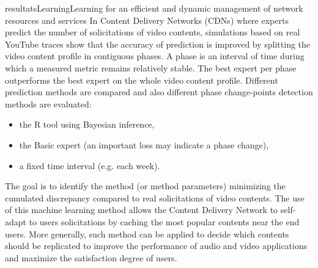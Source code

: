 \documentclass{ra2016}
\begin{document}
\begin{module}{resultats}{Learning}{Learning for an efficient and dynamic management of network resources and services}
In Content Delivery Networks (CDNs) where experts predict the number of solicitations of video contents, simulations based on real YouTube traces show that the accuracy of prediction is improved by splitting the video content profile in contiguous phases. A phase is an interval of time
during which a measured metric remains relatively stable.
 The best expert per phase
outperforms the best expert on the whole video content profile. Different prediction methods are compared and also different phase change-points detection methods are evaluated:
\begin{itemize}
\item the R tool using Bayesian inference,
\item the Basic expert (an important loss may indicate a phase change),
\item a fixed time interval (e.g. each week).
\end{itemize}
The goal is to identify the method (or method parameters) minimizing the cumulated discrepancy compared to real solicitations of video contents.
The use of this machine learning method
allows the Content Delivery Network to self-adapt to users
solicitations by caching the most popular contents near the end
users. More generally, such method can be applied to decide
which contents should be replicated to improve the performance
of audio and video applications and maximize the satisfaction
degree of users.

\end{module}
\end{document}
